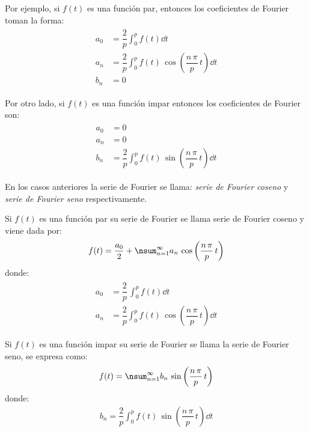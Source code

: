Por ejemplo, si $f(t)$ es una función par, entonces los coeficientes de Fourier toman la forma:
\begin{align}
\begin{aligned}
a_{0} &= \dfrac{2}{p} \int_{0}^{p} f(t) \dd{t} \\[0.5em]
a_{n} &= \dfrac{2}{p} \int_{0}^{p} f(t) \, \cos \left( \dfrac{n \, \pi}{p} \, t \right) \dd{t} \\[0.5em]
b_{n} &= 0
\end{aligned}
\label{eq:ecuacion_06_01_70}
\end{align}

Por otro lado, si $f(t)$ es una función impar entonces los coeficientes de Fourier son:
\begin{align}
\begin{aligned}
a_{0} &= 0 \\[0.5em]
a_{n} &= 0 \\[0.5em]
b_{n} &= \dfrac{2}{p} \int_{0}^{p} f(t) \, \sin \left( \dfrac{n \, \pi}{p} \, t \right) \dd{t}
\end{aligned}
\label{eq:ecuacion_06_01_71}
\end{align}

En los casos anteriores la serie de Fourier se llama: \emph{serie de Fourier coseno} y \emph{serie de Fourier seno} respectivamente.

Si $f(t)$ es una función par su serie de Fourier se llama serie de Fourier coseno y viene dada por:
\begin{align}
f(t) = \dfrac{a_{0}}{2} + \nsum_{n=1}^{\infty} a_{n} \, \cos \left( \dfrac{n \, \pi}{p} \, t \right)
\label{eq:ecuacion_06_01_72}
\end{align}
donde:
\begin{align}
\begin{aligned}
a_{0} &= \dfrac{2}{p} \, \int_{0}^{p} f(t) \dd{t} \\[0.5em]
a_{n} &= \dfrac{2}{p} \int_{0}^{p} f(t) \, \cos \left( \dfrac{n \, \pi}{p} \, t \right) \dd{t} 
\end{aligned}
\label{eq:ecuacion_06_01_73}
\end{align}


Si $f(t)$ es una función impar su serie de Fourier se llama la serie de Fourier seno, se expresa como:
\begin{align}
f(t) = \nsum_{n=1}^{\infty} b_{n} \, \sin \left( \dfrac{n \, \pi}{p} \, t \right)
\label{eq:ecuacion_06_01_76}
\end{align}
donde:
\begin{align}
b_{n} = \dfrac{2}{p} \int_{0}^{p} f(t) \, \sin \left( \dfrac{n \, \pi}{p} \, t \right) \dd{t}
\label{eq:ecuacion_06_01_77}
\end{align}

